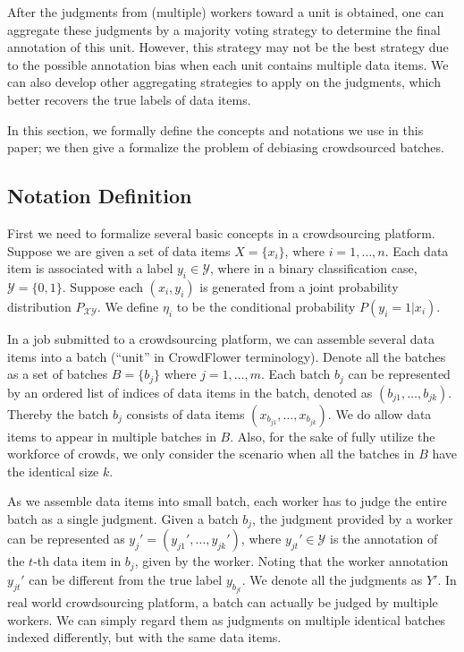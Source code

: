 {After the judgments from (multiple) workers toward a unit is obtained,
one can aggregate these judgments by a majority voting strategy to determine the final annotation of this unit.
However, this strategy may not be the best strategy due to the possible annotation bias when each unit contains multiple data items.
We can also develop other aggregating strategies to apply on the judgments,
which better recovers the true labels of data items.
}

%

In this section, we formally define the concepts and notations we use in this paper;
we then give a formalize the problem of debiasing crowdsourced batches.  


\subsection{Notation Definition}

First we need to formalize several basic concepts in a crowdsourcing platform.
Suppose we are given a set of data items $X = \{x_i\}$, where $i=1, \ldots, n$.
Each data item is associated with a label $y_i \in \mathcal{Y}$,
where in a binary classification case, $\mathcal{Y} = \{0, 1\}$.
Suppose each $(x_i, y_i)$ is generated from a joint probability distribution $P_{\mathcal{X} \mathcal{Y}}$.
We define $\eta_i$ to be the conditional probability $P(y_i = 1 | x_i)$.

In a job submitted to a crowdsourcing platform,
we can assemble several data items into a batch (``unit'' in CrowdFlower terminology).
Denote all the batches as a set of batches $B = \{b_j\}$ where $j = 1, \ldots, m$.
Each batch $b_j$ can be represented by an ordered list of indices of data items in the batch,
denoted as $(b_{j1}, \ldots, b_{jk})$.
Thereby the batch $b_j$ consists of data items $(x_{b_{j1}}, \ldots, x_{b_{jk}})$.
We do allow data items to appear in multiple batches in $B$.
Also, for the sake of fully utilize the workforce of crowds,
we only consider the scenario when all the batches in $B$ have the identical size $k$.

As we assemble data items into small batch,
each worker has to judge the entire batch as a single judgment.
Given a batch $b_j$, the judgment provided by a worker can be represented as $y_j' = (y_{j1}', \ldots, y_{jk}')$,
where $y_{j t}' \in \mathcal{Y}$ is the annotation of the $t$-th data item in $b_j$, given by the worker.
Noting that the worker annotation $y_{j t}'$ can be different from the true label $y_{b_{j t}}$.
We denote all the judgments as $Y'$.
In real world crowdsourcing platform, a batch can actually be judged by multiple workers.
We can simply regard them as judgments on multiple identical batches indexed differently, but with the same data items.


